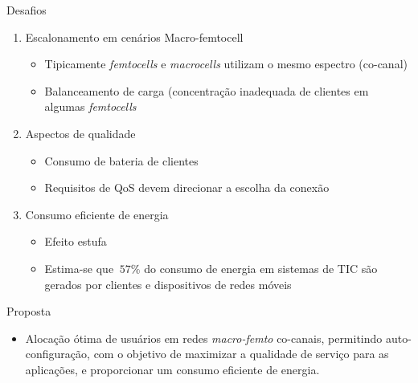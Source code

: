 \begin{frame}
  \begin{block}{Desafios}
    \begin{enumerate}
      \pause
      \item \alert{Escalonamento em cenários Macro-femtocell}
        \begin{itemize}
          \item Tipicamente \textit{femtocells} e \textit{macrocells} utilizam
          o mesmo espectro (co-canal)
          \item Balanceamento de carga (concentração inadequada de clientes em
          algumas \textit{femtocells}
        \end{itemize}
      \pause
      \item \alert{Aspectos de qualidade}
        \begin{itemize}
          \item Consumo de bateria de clientes
          \item Requisitos de QoS devem direcionar a escolha da conexão
        \end{itemize}
      \pause
      \item \alert{Consumo eficiente de energia}
        \begin{itemize}
          \item Efeito estufa
          \item Estima-se que $~57\%$ do consumo de energia em sistemas de TIC
          são gerados por clientes e dispositivos de redes móveis
        \end{itemize}
    \end{enumerate}
  \end{block}
\end{frame}

\begin{frame}
  \begin{block}{Proposta}
    \begin{itemize}
      \item \alert{Alocação ótima} de usuários em redes \textit{macro-femto}
      co-canais, permitindo \alert{auto-configuração}, com o objetivo de
      \alert{maximizar a qualidade de serviço} para as aplicações, e
      proporcionar um \alert{consumo eficiente} de energia.
    \end{itemize}
  \end{block}
\end{frame}

